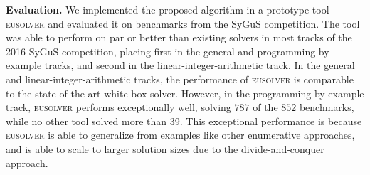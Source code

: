 \documentclass{llncs}
\newcommand\SynthFun{f}
\newcommand\ITE[3]{\mathtt{if}~#1~\mathtt{then}~#2~\mathtt{else}~#3}
\newcommand{\sygus}{{\sffamily\fontsize{8.5}{10}\selectfont
    SyGuS}\xspace}
\renewcommand{\paragraph}[1]{\par\noindent\textbf{#1.}}
\newcommand{\eusolver}{\textsc{eusolver}\xspace}
\begin{document}

\paragraph{Evaluation}
We implemented the proposed algorithm in a prototype tool \eusolver and
evaluated it on benchmarks from the \sygus competition.
The tool was able to perform on par or better than existing solvers in
most tracks of the 2016 \sygus competition, placing first in the general
and programming-by-example tracks, and second in the
linear-integer-arithmetic track.
In the general and linear-integer-arithmetic tracks, the performance of
\eusolver is comparable to the state-of-the-art white-box solver.
However, in the programming-by-example track, \eusolver performs
exceptionally well, solving $787$ of the $852$ benchmarks, while no
other tool solved more than $39$.
This exceptional performance is because \eusolver is able to
generalize from examples like other enumerative approaches, and is
able to scale to larger solution sizes due to the divide-and-conquer
approach.
\end{document}
